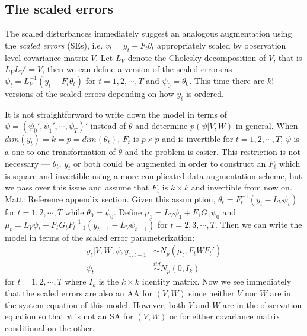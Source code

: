 \documentclass{article}
\newcommand{\matt}[1]{{\color{red} Matt: #1}}
\begin{document}
\subsection{The scaled errors}\label{sec:DAs:error}
The scaled disturbances immediately suggest an analogous augmentation using the {\it scaled errors} (SEs), i.e. $v_t=y_t - F_t\theta_t$ appropriately scaled by observation level covariance matrix $V$. Let $L_V$ denote the Cholesky decomposition of $V$, that is $L_VL_V'=V$, then we can define a version of the scaled errors as $\psi_t = L_V^{-1}(y_t - F_t\theta_t)$ for $t=1,2,\cdots,T$ and $\psi_0 = \theta_0$. This time there are $k!$ versions of the scaled errors depending on how $y_t$ is ordered.

It is not straightforward to write down the model in terms of $\psi=(\psi_0',\psi_1',\cdots,\psi_T)'$ instead of $\theta$ and determine $p(\psi|V,W)$ in general. When $dim(y_t)=k=p=dim(\theta_t)$, $F_t$ is $p\times p$ and is invertible for $t=1,2,\cdots,T$, $\psi$ is a one-to-one transformation of $\theta$ and the problem is easier. This restriction is not necessary --- $\theta_t$, $y_t$ or both could be augmented in order to construct an $\tilde{F}_t$ which is square and invertible using a more complicated data augmentation scheme, but we pass over this issue and assume that $F_t$ is $k\times k$ and invertible from now on. \matt{Reference appendix section.} Given this assumption, $\theta_t = F_t^{-1}(y_t - L_V\psi_t)$ for $t=1,2,\cdots,T$ while $\theta_0=\psi_0$. Define $\mu_1 = L_V\psi_1 + F_1G_1\psi_0$ and $\mu_t =L_V\psi_t + F_tG_tF_{t-1}^{-1}(y_{t-1} - L_{V}\psi_{t-1})$ for $t=2,3,\cdots,T$. Then we can write the model in terms of the scaled error parameterization:
\begin{align*}
  y_t|V,W,\psi,y_{1:t-1} &\sim N_p(\mu_t, F_tWF_t')\\
  \psi_t & \stackrel{iid}{\sim} N_p(0,I_k)
\end{align*}
for $t=1,2,\cdots,T$ where $I_k$ is the $k\times k$ identity matrix. Now we see immediately that the scaled errors are also an AA for $(V,W)$ since neither $V$ nor $W$ are in the system equation of this model. However, both $V$ and $W$ are in the observation equation so that $\psi$ is not an SA for $(V,W)$ or for either covariance matrix conditional on the other.
\end{document}
